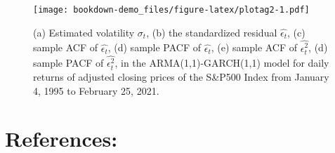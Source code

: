 \documentclass[]{book}
\newenvironment{Shaded}{\begin{snugshade}}{\end{snugshade}}
\newcommand{\DataTypeTok}[1]{\textcolor[rgb]{0.13,0.29,0.53}{#1}}
\newcommand{\DecValTok}[1]{\textcolor[rgb]{0.00,0.00,0.81}{#1}}
\newcommand{\KeywordTok}[1]{\textcolor[rgb]{0.13,0.29,0.53}{\textbf{#1}}}
\newcommand{\NormalTok}[1]{#1}
\newcommand{\OperatorTok}[1]{\textcolor[rgb]{0.81,0.36,0.00}{\textbf{#1}}}
\newcommand{\OtherTok}[1]{\textcolor[rgb]{0.56,0.35,0.01}{#1}}
\newcommand{\StringTok}[1]{\textcolor[rgb]{0.31,0.60,0.02}{#1}}
\begin{document}
\begin{Shaded}
\end{Shaded}

\begin{figure}
\centering
\texttt{[image: bookdown-demo\_files/figure-latex/plotag2-1.pdf]}
\caption{\label{fig:plotag2}(a) Estimated volatility \(\hat{\sigma_t}\), (b) the standardized residual \(\hat{\epsilon_t}\), (c) sample ACF of \(\hat{\epsilon_t}\), (d) sample PACF of \(\hat{\epsilon_t}\), (e) sample ACF of \(\hat{\epsilon_t^2}\), (d) sample PACF of \(\hat{\epsilon_t^2}\), in the ARMA(1,1)-GARCH(1,1) model for daily returns of adjusted closing prices of the S\&P500 Index from January 4, 1995 to February 25, 2021.}
\end{figure}

\newpage

\hypertarget{references-2}{%
\section{References:}\label{references-2}}
\end{document}
